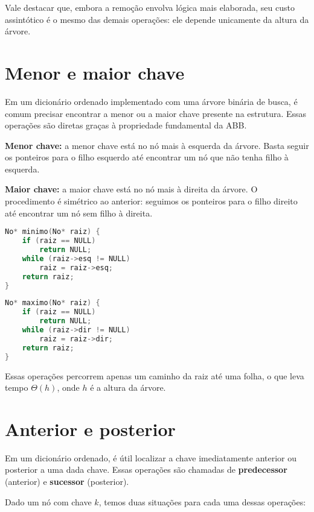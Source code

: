 Vale destacar que, embora a remoção envolva lógica mais elaborada, seu custo assintótico é o mesmo das demais operações: ele depende unicamente da altura da árvore.

\section{Menor e maior chave}

Em um dicionário ordenado implementado com uma árvore binária de busca, é comum precisar encontrar a menor ou a maior chave presente na estrutura. 
Essas operações são diretas graças à propriedade fundamental da ABB.

\textbf{Menor chave:} a menor chave está no nó mais à esquerda da árvore. 
Basta seguir os ponteiros para o filho esquerdo até encontrar um nó que não tenha filho à esquerda.

\textbf{Maior chave:} a maior chave está no nó mais à direita da árvore. 
O procedimento é simétrico ao anterior: seguimos os ponteiros para o filho direito até encontrar um nó sem filho à direita.

\begin{lstlisting}[language=C, caption={Busca da menor chave em ABB}]
No* minimo(No* raiz) {
    if (raiz == NULL)
        return NULL;
    while (raiz->esq != NULL)
        raiz = raiz->esq;
    return raiz;
}
\end{lstlisting}

\begin{lstlisting}[language=C, caption={Busca da maior chave em ABB}]
No* maximo(No* raiz) {
    if (raiz == NULL)
        return NULL;
    while (raiz->dir != NULL)
        raiz = raiz->dir;
    return raiz;
}
\end{lstlisting}

Essas operações percorrem apenas um caminho da raiz até uma folha, o que leva tempo $\Theta(h)$, onde $h$ é a altura da árvore. 

\section{Anterior e posterior}

Em um dicionário ordenado, é útil localizar a chave imediatamente anterior ou posterior a uma dada chave. 
Essas operações são chamadas de \textbf{predecessor} (anterior) e \textbf{sucessor} (posterior).

Dado um nó com chave $k$, temos duas situações para cada uma dessas operações:

